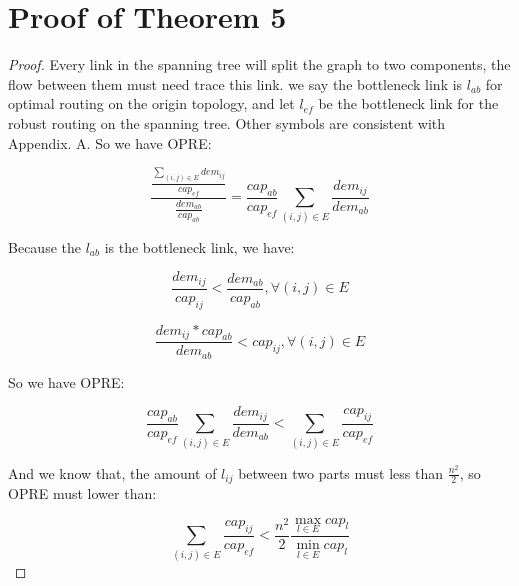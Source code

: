 \documentclass[conference]{IEEEtran}
\begin{document}
\section{Proof of Theorem 5}
\begin{proof}
Every link in the spanning tree will split the graph to two components, the flow between them must need trace this link.
we say the bottleneck link is $l_{ab}$ for optimal routing on the origin topology, and let $l_{ef}$ be the bottleneck link for
the robust routing on the spanning tree. Other symbols are consistent with Appendix. A. So we have OPRE:

\begin{equation}
\label{equation_C_1}
    \frac{\frac{\sum_{(i,j) \in E} dem_{ij}}{cap_{ef}}}{\frac{dem_{ab}}{cap_{ab}}} = \frac{cap_{ab}}{cap_{ef}} \sum_{(i,j) \in E} \frac{dem_{ij}}{dem_{ab}}
\end{equation}

Because the $l_{ab}$ is the bottleneck link, we have:

\begin{equation}
\label{ineqaution_C_2}
    \frac{dem_{ij}}{cap_{ij}} < \frac{dem_{ab}}{cap_{ab}}, \forall (i,j) \in E
\end{equation}

\begin{equation}
\label{ineqaution_C_3}
    \frac{dem_{ij} * cap_{ab}}{dem_{ab}} < cap_{ij}, \forall (i,j) \in E
\end{equation}

So we have OPRE:

\begin{equation}
\label{ineqaution_C_4}
    \frac{cap_{ab}}{cap_{ef}} \sum_{(i,j) \in E} \frac{dem_{ij}}{dem_{ab}} < \sum_{(i,j) \in E} \frac{cap_{ij}}{cap_{ef}}
\end{equation}

And we know that, the amount of $l_{ij}$ between two parts must less than $\frac{n^2}{2}$, so OPRE must lower than:

\begin{equation}
\label{ineqaution_C_result}
    \sum_{(i,j) \in E} \frac{cap_{ij}}{cap_{ef}} < \frac{n^2}{2} \frac{\max_{l \in E} cap_l}{\min_{l \in E} cap_l}
\end{equation}

\end{proof}

\end{document}
